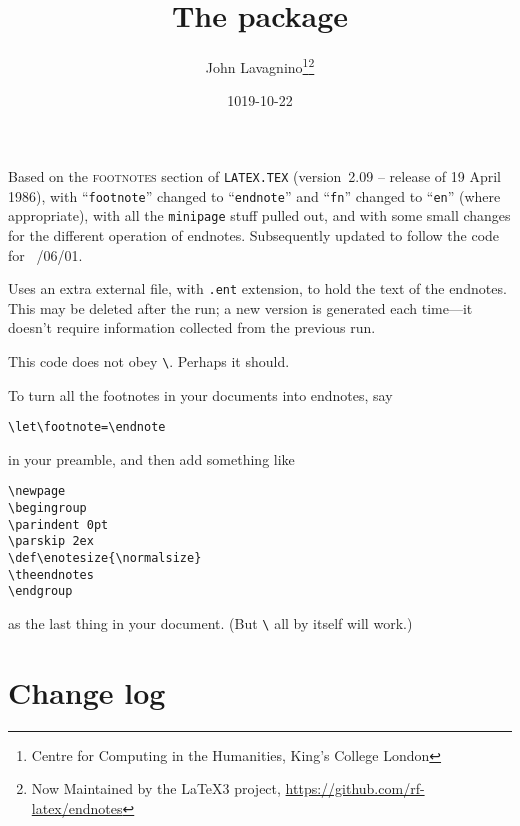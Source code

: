 \documentclass[pagesize=auto]{scrartcl}
\title{The \pkg{endnotes} package}
\author{John Lavagnino\thanks{Centre for Computing in the Humanities, King's College London}\thanks{Now Maintained by the \LaTeX3 project, \url{https://github.com/rf-latex/endnotes}}}
\date{1019-10-22}
\makeatletter
\newcommand*{\cs}[1]{\texttt{\textbackslash#1}}
\newcommand*{\cmd}[1]{\cs{\expandafter\@gobble\string#1}}
\newcommand*{\env}[1]{\texttt{#1}}
\makeatother
\begin{document}
\maketitle

\noindent
Based on the \textsc{footnotes} section of
\texttt{LATEX.TEX} (version~2.09 -- release of 19 April 1986), with
``\texttt{footnote}'' changed to ``\texttt{endnote}'' and ``\texttt{fn}'' changed to ``\texttt{en}'' (where
appropriate), with all the \env{minipage} stuff pulled out, and with
some small changes for the different operation of endnotes.
Subsequently updated to follow the code for
\LaTeXe\ /06/01\textrangle.

Uses an extra external file, with \texttt{.ent} extension, to hold the
text of the endnotes.  This may be deleted after the run; a new
version is generated each time---it doesn't require information
collected from the previous run.

This code does not obey \cmd{\nofiles}.  Perhaps it should.

\bigskip

To turn all the footnotes in your documents into endnotes, say
%
\begin{verbatim}
\let\footnote=\endnote
\end{verbatim}
%
in your preamble, and then add something like
%
\begin{verbatim}
\newpage
\begingroup
\parindent 0pt
\parskip 2ex
\def\enotesize{\normalsize}
\theendnotes
\endgroup
\end{verbatim}
%
as the last thing in your document.  (But \cmd{\theendnotes} all
by itself will work.)


\section{Change log}

\renewcommand*{\labelenumi}{\theenumi)}
\end{document}
